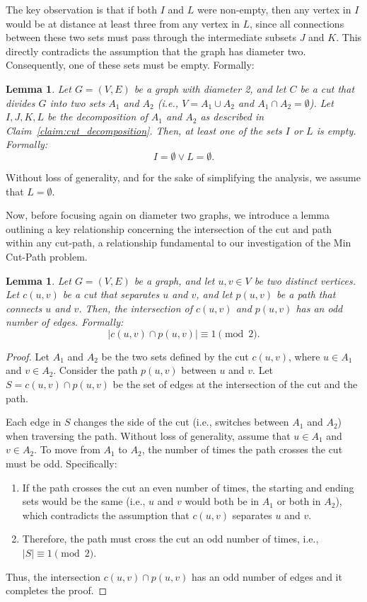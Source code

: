 \documentclass[journal ]{new-aiaa}
\numberwithin{equation}{section}
\theoremstyle{definition}
\theoremstyle{plain}
\newtheorem{lemma}[definition]{Lemma}
\theoremstyle{remark}
\begin{document}
The key observation is that if both \(I\) and \(L\) were non-empty, then any vertex in \(I\) would be at distance at least three from any vertex in \(L\), since all connections between these two sets must pass through the intermediate subsets \(J\) and \(K\).  
This directly contradicts the assumption that the graph has diameter two.  
Consequently, one of these sets must be empty. Formally:


\begin{lemma}
\label{claim:empty_I_or_J}
Let \(G = (V, E)\) be a graph with diameter 2, and let \(C\) be a cut that divides \(G\) into two sets \(A_1\) and \(A_2\) (i.e., \(V = A_1 \cup A_2\) and \(A_1 \cap A_2 = \emptyset\)). Let \(I, J, K, L\) be the decomposition of \(A_1\) and \(A_2\) as described in Claim~\ref{claim:cut_decomposition}. Then, at least one of the sets \(I\) or \(L\) is empty. Formally:
\[
I = \emptyset \lor L = \emptyset.
\]
\end{lemma}

Without loss of generality, and for the sake of simplifying the analysis, we assume that \(L = \emptyset\).

Now, before focusing again on diameter two graphs, we introduce a lemma outlining a key relationship concerning the intersection of the cut and path within any cut-path, a relationship fundamental to our investigation of the Min Cut-Path problem.

\begin{lemma}
\label{claim:odd_diam_2}
Let \(G = (V, E)\) be a graph, and let \(u, v \in V\) be two distinct vertices. Let \(c(u, v)\) be a cut that separates \(u\) and \(v\), and let \(p(u, v)\) be a path that connects \(u\) and \(v\). Then, the intersection of \(c(u, v)\) and \(p(u, v)\) has an odd number of edges. Formally:
\[
|c(u, v) \cap p(u, v)| \equiv 1 \pmod{2}.
\]
\end{lemma}

\begin{proof}
Let \(A_1\) and \(A_2\) be the two sets defined by the cut \(c(u, v)\), where \(u \in A_1\) and \(v \in A_2\). Consider the path \(p(u, v)\) between \(u\) and \(v\). Let \(S = c(u, v) \cap p(u, v)\) be the set of edges at the intersection of the cut and the path. 

Each edge in \(S\) changes the side of the cut (i.e., switches between \(A_1\) and \(A_2\)) when traversing the path. Without loss of generality, assume that \(u \in A_1\) and \(v \in A_2\). To move from \(A_1\) to \(A_2\), the number of times the path crosses the cut must be odd. Specifically:
\begin{enumerate}
    \item If the path crosses the cut an even number of times, the starting and ending sets would be the same (i.e., \(u\) and \(v\) would both be in \(A_1\) or both in \(A_2\)), which contradicts the assumption that \(c(u, v)\) separates \(u\) and \(v\).
    \item Therefore, the path must cross the cut an odd number of times, i.e., \(|S| \equiv 1 \pmod{2}\).
\end{enumerate}
Thus, the intersection \(c(u, v) \cap p(u, v)\) has an odd number of edges and it completes the proof.
\end{proof}
\end{document}
